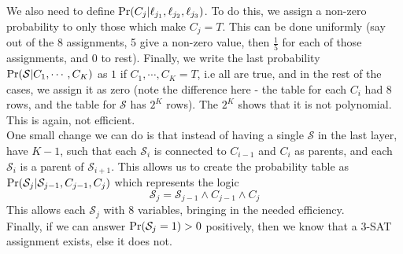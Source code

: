 We also need to define $\text{Pr}(C_j|\ell_{j_1}, \ell_{j_2}, \ell_{j_3})$. To do this, we assign a non-zero probability to only those which make $C_j=T$. This can be done uniformly (say out of the 8 assignments, 5 give a non-zero value, then $\frac{1}{5}$ for each of those assignments, and $0$ to rest). Finally, we write the last probability $\text{Pr}(\mathcal S|C_1, \cdots, C_K)$ as $1$ if $C_1, \cdots, C_K = T$, i.e all are true, and in the rest of the cases, we assign it as zero (note the difference here - the table for each $C_i$ had 8 rows, and the table for $\mathcal S$ has $2^K$ rows). The $2^K$ shows that it is not polynomial. This is again, not efficient. \\
One small change we can do is that instead of having a single $\mathcal S$ in the last layer, have $K-1$, such that each $\mathcal{S}_i$ is connected to $C_{i-1}$ and $C_i$ as parents, and each $\mathcal{S}_i$ is a parent of $\mathcal{S}_{i+1}$. This allows us to create the probability table as $\text{Pr}(\mathcal{S}_j | \mathcal{S}_{j-1}, C_{j-1}, C_j)$ which represents the logic
\begin{equation}
	\mathcal{S}_j =  \mathcal{S}_{j-1} \land C_{j-1} \land C_j 
\end{equation} 
This allows each $\mathcal{S}_j$ with 8 variables, bringing in the needed efficiency. \\
Finally, if we can answer $\text{Pr}(\mathcal{S}_j=1) > 0$ positively, then we know that a $3$-SAT assignment exists, else it does not.